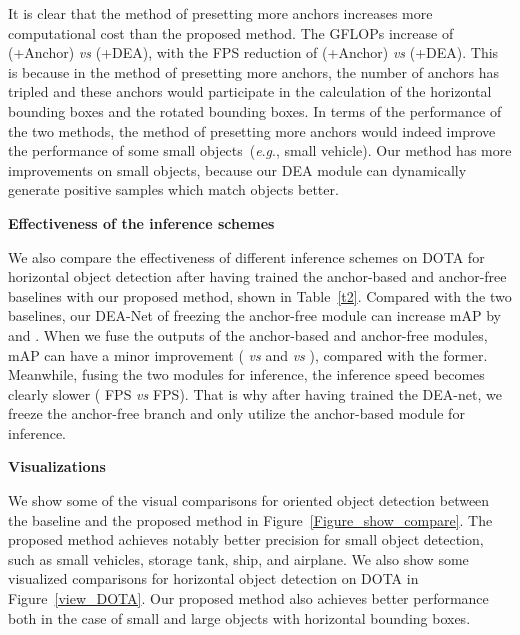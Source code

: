 \documentclass[journal]{IEEEtran}
\newcommand{\myparagraph}[1]{\vspace{0.1em}\noindent\textbf{#1}}
\newcommand{\eg}{\textit{e}.\textit{g}.}
\begin{document}
It is clear that the method of presetting more anchors increases more computational cost than the proposed method. The GFLOPs increase of  (+Anchor) \emph{vs}  (+DEA), with the FPS reduction of  (+Anchor) \emph{vs}  (+DEA). This is because in the method of presetting more anchors, the number of anchors has tripled and these anchors would participate in the calculation of the horizontal bounding boxes and the rotated bounding boxes. In terms of the performance of the two methods, the method of presetting more anchors would indeed improve the performance of some small objects~(\eg, small vehicle). Our method has more improvements on small objects, because our DEA module can dynamically generate positive samples which match objects better. 


\myparagraph{Effectiveness of the inference schemes}

We also compare the effectiveness of different inference schemes on DOTA for horizontal object detection after having trained the anchor-based and anchor-free baselines with our proposed method, shown in Table~\ref{t2}. Compared with the two baselines, our DEA-Net of freezing the anchor-free module can increase mAP by  and . When we fuse the outputs of the anchor-based and anchor-free modules, mAP can have a minor improvement ( \emph{vs}  and  \emph{vs} ), compared with the former. Meanwhile, fusing the two modules for inference, the inference speed becomes clearly slower ( FPS \emph{vs}  FPS). That is why after having trained the DEA-net, we freeze the anchor-free branch and only utilize the anchor-based module for inference.      

\myparagraph{Visualizations}

We show some of the visual comparisons for oriented object detection between the baseline and the proposed method in Figure~\ref{Figure_show_compare}. The proposed method achieves notably better precision for small object detection, such as small vehicles, storage tank, ship, and airplane. We also show some visualized comparisons for horizontal object detection on DOTA in Figure~\ref{view_DOTA}. Our proposed method also achieves better performance both in the case of small and large objects with horizontal bounding boxes.
\end{document}
